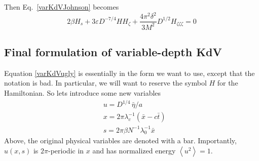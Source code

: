 \documentclass[12pt]{article}
\newcommand{\mean}[1]{\left< #1 \right>}
\newcommand{\eps}{\varepsilon}
\newcommand{\lamfac}{N}
\begin{document}
Then Eq.~\eqref{varKdVJohnson} becomes
\begin{equation}
\label{varKdVugly}
2 \beta H_s + 3 \eps D^{-7/4} H H_\zeta
+ \frac{4 \pi^2 \delta^2}{3 M^2} D^{1/2} H_{\zeta \zeta \zeta} = 0
\end{equation}

\subsection{Final formulation of variable-depth KdV}

Equation \eqref{varKdVugly} is essentially in the form we want to use, except that the notation is bad. In particular, we will want to reserve the symbol $H$ for the Hamiltonian. So lets introduce some new variables
\begin{align}
& u = D^{1/4} \, \bar{\eta}/a \\
& x = 2\pi \lambda_c^{-1} (\bar{x} - c \bar{t})  \\
& s = 2 \pi \beta \lamfac^{-1} \lambda_0^{-1} \bar{x}
\end{align}
Above, the original physical variables are denoted with a bar. Importantly, $u(x,s)$ is $2\pi$-periodic in $x$ and has normalized energy $\mean{u^2} = 1$.
\end{document}
